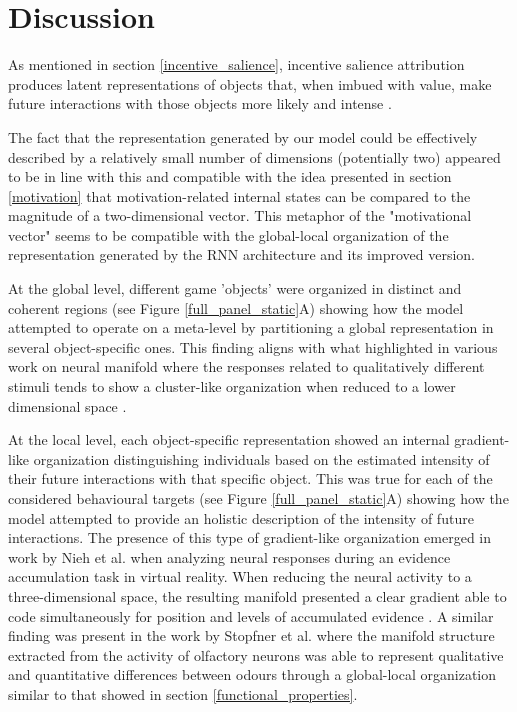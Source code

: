 \section{Discussion}
As mentioned in section  \ref{incentive_salience}, incentive salience attribution produces latent representations of objects that, when imbued with value, make future interactions with those objects more likely and intense \cite{berridge1998role,berridge2004motivation}. 

The fact that the representation generated by our model could be effectively described by a relatively small number of dimensions (potentially two) appeared to be in line with this and compatible with the idea presented in section \ref{motivation} that motivation-related internal states can be compared to the magnitude of a two-dimensional vector. This metaphor of the "motivational vector" seems to be compatible with the global-local organization of the representation generated by the RNN architecture and its improved version. 

At the global level, different game 'objects' were organized in distinct and coherent regions (see Figure \ref{full_panel_static}A) showing how the model attempted to operate on a meta-level by partitioning a global representation in several object-specific ones. This finding aligns with what highlighted in various work on neural manifold where the responses related to qualitatively different stimuli tends to show a cluster-like organization when reduced to a lower dimensional space \cite{stopfer2003intensity, gallego2017neural, ganmor2015thesaurus}. 

At the local level, each object-specific representation showed an internal gradient-like organization distinguishing individuals based on the estimated intensity of their future interactions with that specific object. This was true for each of the considered behavioural targets (see Figure \ref{full_panel_static}A) showing how the model attempted to provide an holistic description of the intensity of future interactions. The presence of this type of gradient-like organization emerged in work by Nieh et al. \cite{nieh2021geometry} when analyzing neural responses during an evidence accumulation task in virtual reality. When reducing the neural activity to a three-dimensional space, the resulting manifold presented a clear gradient able to code simultaneously for position and levels of accumulated evidence \cite{nieh2021geometry}. A similar finding was present in the work by Stopfner et al. \cite{stopfer2003intensity} where the manifold structure extracted from the activity of olfactory neurons was able to represent qualitative and quantitative differences between odours through a global-local organization similar to that showed in section \ref{functional_properties}.

